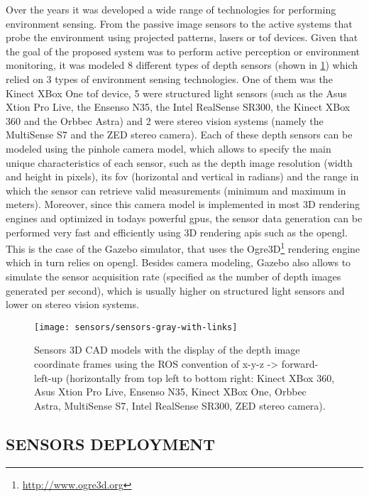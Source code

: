 Over the years it was developed a wide range of technologies for performing environment sensing. From the passive image sensors to the active systems that probe the environment using projected patterns, lasers or \gls{tof} devices. Given that the goal of the proposed system was to perform active perception or environment monitoring, it was modeled 8 different types of depth sensors (shown in \cref{fig:sensors}) which relied on 3 types of environment sensing technologies. One of them was the Kinect XBox One \gls{tof} device, 5 were structured light sensors (such as the Asus Xtion Pro Live, the Ensenso N35, the Intel RealSense SR300, the Kinect XBox 360 and the Orbbec Astra) and 2 were stereo vision systems (namely the MultiSense S7 and the ZED stereo camera). Each of these depth sensors can be modeled using the pinhole camera model, which allows to specify the main unique characteristics of each sensor, such as the depth image resolution (width and height in pixels), its \gls{fov} (horizontal and vertical in radians) and the range in which the sensor can retrieve valid measurements (minimum and maximum in meters). Moreover, since this camera model is implemented in most 3D rendering engines and optimized in todays powerful \glspl{gpu}, the sensor data generation can be performed very fast and efficiently using 3D rendering \glspl{api} such as the \gls{opengl}. This is the case of the Gazebo simulator, that uses the Ogre3D\footnote{\url{http://www.ogre3d.org}} rendering engine which in turn relies on \gls{opengl}. Besides camera modeling, Gazebo also allows to simulate the sensor acquisition rate (specified as the number of depth images generated per second), which is usually higher on structured light sensors and lower on stereo vision systems.

\begin{figure}
	\centering
	\texttt{[image: sensors/sensors-gray-with-links]}
	\caption{Sensors 3D CAD models with the display of the depth image coordinate frames using the ROS convention of x-y-z -> forward-left-up (horizontally from top left to bottom right: Kinect XBox 360, Asus Xtion Pro Live, Ensenso N35, Kinect XBox One, Orbbec Astra, MultiSense S7, Intel RealSense SR300, ZED stereo camera).}
	\label{fig:sensors}
\end{figure}


\subsection{\uppercase{Sensors deployment}}\label{subsec:sensors-deployment}

